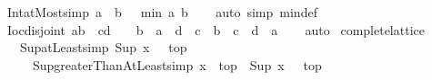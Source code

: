 \begin{isabellebody}
\endisatagproof
{\isafoldproof}%
%
\isadelimproof
\isanewline
%
\endisadelimproof
\isanewline
{}\isamarkupfalse%
\ Int{\isacharunderscore}{\kern0pt}atMost{\isacharbrackleft}{\kern0pt}simp{\isacharbrackright}{\kern0pt}{\isacharcolon}{\kern0pt}\ {\isachardoublequoteopen}{\isacharbraceleft}{\kern0pt}{\isachardot}{\kern0pt}{\isachardot}{\kern0pt}a{\isacharbraceright}{\kern0pt}\ {\isasyminter}\ {\isacharbraceleft}{\kern0pt}{\isachardot}{\kern0pt}{\isachardot}{\kern0pt}b{\isacharbraceright}{\kern0pt}\ {\isacharequal}{\kern0pt}\ {\isacharbraceleft}{\kern0pt}{\isachardot}{\kern0pt}{\isachardot}{\kern0pt}\ min\ a\ b{\isacharbraceright}{\kern0pt}{\isachardoublequoteclose}\isanewline
%
\isadelimproof
\ \ %
\endisadelimproof
%
\isatagproof
{}\isamarkupfalse%
\ {\isacharparenleft}{\kern0pt}auto\ simp{\isacharcolon}{\kern0pt}\ min{\isacharunderscore}{\kern0pt}def{\isacharparenright}{\kern0pt}%
\endisatagproof
{\isafoldproof}%
%
\isadelimproof
\isanewline
%
\endisadelimproof
\isanewline
{}\isamarkupfalse%
\ Ioc{\isacharunderscore}{\kern0pt}disjoint{\isacharcolon}{\kern0pt}\ {\isachardoublequoteopen}{\isacharbraceleft}{\kern0pt}a{\isacharless}{\kern0pt}{\isachardot}{\kern0pt}{\isachardot}{\kern0pt}b{\isacharbraceright}{\kern0pt}\ {\isasyminter}\ {\isacharbraceleft}{\kern0pt}c{\isacharless}{\kern0pt}{\isachardot}{\kern0pt}{\isachardot}{\kern0pt}d{\isacharbraceright}{\kern0pt}\ {\isacharequal}{\kern0pt}\ {\isacharbraceleft}{\kern0pt}{\isacharbraceright}{\kern0pt}\ {\isasymlongleftrightarrow}\ b\ {\isasymle}\ a\ {\isasymor}\ d\ {\isasymle}\ c\ {\isasymor}\ b\ {\isasymle}\ c\ {\isasymor}\ d\ {\isasymle}\ a{\isachardoublequoteclose}\isanewline
%
\isadelimproof
\ \ %
\endisadelimproof
%
\isatagproof
{}\isamarkupfalse%
\ auto%
\endisatagproof
{\isafoldproof}%
%
\isadelimproof
\isanewline
%
\endisadelimproof
\isanewline
{}\isamarkupfalse%
\isanewline
\isanewline
{}\isamarkupfalse%
\ complete{\isacharunderscore}{\kern0pt}lattice\isanewline
{}\isanewline
\isanewline
{}\isamarkupfalse%
\isanewline
\ \ \ Sup{\isacharunderscore}{\kern0pt}atLeast{\isacharbrackleft}{\kern0pt}simp{\isacharbrackright}{\kern0pt}{\isacharcolon}{\kern0pt}\ {\isachardoublequoteopen}Sup\ {\isacharbraceleft}{\kern0pt}x\ {\isachardot}{\kern0pt}{\isachardot}{\kern0pt}{\isacharbraceright}{\kern0pt}\ {\isacharequal}{\kern0pt}\ top{\isachardoublequoteclose}\isanewline
\ \ \ \ \ Sup{\isacharunderscore}{\kern0pt}greaterThanAtLeast{\isacharbrackleft}{\kern0pt}simp{\isacharbrackright}{\kern0pt}{\isacharcolon}{\kern0pt}\ {\isachardoublequoteopen}x\ {\isacharless}{\kern0pt}\ top\ {\isasymLongrightarrow}\ Sup\ {\isacharbraceleft}{\kern0pt}x\ {\isacharless}{\kern0pt}{\isachardot}{\kern0pt}{\isachardot}{\kern0pt}{\isacharbraceright}{\kern0pt}\ {\isacharequal}{\kern0pt}\ top{\isachardoublequoteclose}\isanewline

\end{isabellebody}
